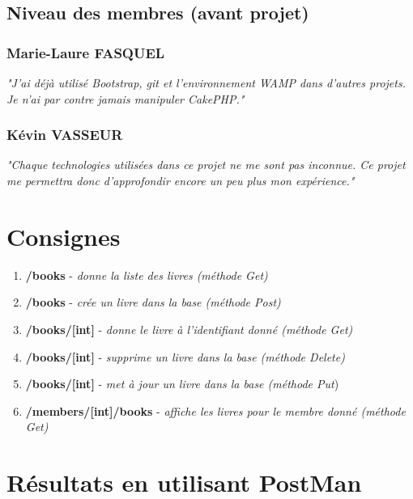 \documentclass{report}
\begin{document}
		\subsection{Niveau des membres (avant projet)}
			\subsubsection{Marie-Laure FASQUEL}
			\textit{"J'ai d\'{e}j\`{a} utilis\'{e} Bootstrap, git et l'environnement WAMP dans d'autres projets. Je n'ai par contre jamais manipuler CakePHP."}
			\subsubsection{K\'{e}vin VASSEUR}
			\textit{"Chaque technologies utilis\'{e}es dans ce projet ne me sont pas inconnue. Ce projet me permettra donc d'approfondir encore un peu plus mon exp\'{e}rience."}
			
	\section{Consignes}
	\begin{enumerate}
		\item \textbf{/books} - \textit{donne la liste des livres (m\'{e}thode Get)}
		\item \textbf{/books} - \textit{cr\'{e}e un livre dans la base (m\'{e}thode Post)}
		\item \textbf{/books/[int]} - \textit{donne le livre \`{a} l'identifiant donn\'{e} (m\'{e}thode Get)} 
		\item \textbf{/books/[int]} - \textit{supprime un livre dans la base (m\'{e}thode Delete)} 
		\item \textbf{/books/[int]} - \textit{met \`{a} jour un livre dans la base (m\'{e}thode Put}) 
		\item \textbf{/members/[int]/books} - \textit{affiche les livres pour le membre donn\'{e} (m\'{e}thode Get)} 
	\end{enumerate}
	
	
	\section{R\'{e}sultats en utilisant PostMan}
\end{document}
